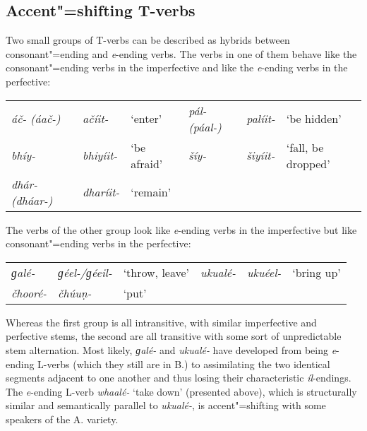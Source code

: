 \addtocounter{footnote}{-2}

\subsection{Accent"=shifting T-verbs}
\label{subsec:8-3-7}


Two small groups of T-verbs can be described as hybrids between consonant"=ending and \textit{e}-ending verbs. The verbs in one of them behave like the consonant"=ending verbs in the imperfective and like the \textit{e}-ending verbs in the perfective:


\begin{table}[H]
\begin{tabularx}{\textwidth}{ Q l l l l Q }
\textit{áč- (áač-)} &
\textit{ačíit-} &
`enter' &
\textit{pál- (páal-)} &
\textit{palíit-} &
`be hidden'\\
\textit{bhíy-} &
\textit{bhiyíit-} &
`be afraid' &
\textit{šíy-} &
\textit{šiyíit-} &
`fall, be dropped'\\
\textit{dhár- (dháar-)} &
\textit{dharíit-} &
`remain' &
&
&
\\
\end{tabularx}
\end{table}


The verbs of the other group look like \textit{e}-ending verbs in the imperfective but like consonant"=ending verbs in the perfective: 


\begin{table}[H]
\begin{tabularx}{\textwidth}{ Q l l Q Q l }

\textit{ɡalé-} &
\textit{ɡéel-/ɡéeil-} &
`throw, leave'{\protect\footnotemark} &
\textit{ukualé-} &
\textit{ukuéel-} &
`bring up'{\protect\footnotemark}\\
\textit{čhooré-} &
\textit{čhúuṇ-} &
`put' &
&
&
\\
\end{tabularx}
\end{table}

\addtocounter{footnote}{-2}

Whereas the first group is all intransitive, with similar imperfective and perfective stems, the second are all transitive with some sort of unpredictable stem alternation. Most likely, \textit{ɡalé-} and \textit{ukualé-} have developed from being \textit{e}-ending L-verbs (which they still are in B.) to assimilating the two identical segments adjacent to one another and thus losing their characteristic \textit{íl}-endings. The \textit{e}-ending L-verb \textit{whaalé-} `take down' (presented above), which is structurally similar and semantically parallel to \textit{ukualé-}, is accent"=shifting with some speakers of the A. variety. 


